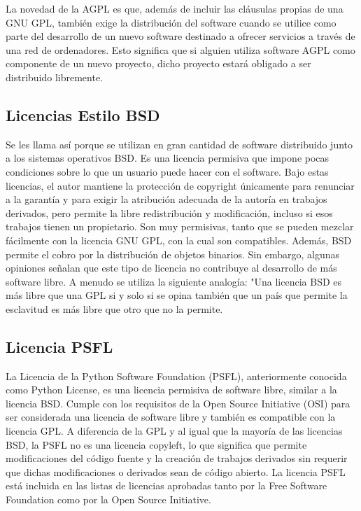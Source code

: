 La novedad de la AGPL es que, además de incluir las cláusulas propias de una GNU GPL, también exige la distribución del software cuando se utilice como parte del desarrollo de un nuevo software destinado a ofrecer servicios a través de una red de ordenadores. Esto significa que si alguien utiliza software AGPL como componente de un nuevo proyecto, dicho proyecto estará obligado a ser distribuido libremente.\par
				
			\subsection{Licencias Estilo BSD}\label{bsd}
			
				Se les llama así porque se utilizan en gran cantidad de software distribuido junto a los sistemas operativos BSD. Es una licencia permisiva que impone pocas condiciones sobre lo que un usuario puede hacer con el software. Bajo estas licencias, el autor mantiene la protección de copyright únicamente para renunciar a la garantía y para exigir la atribución adecuada de la autoría en trabajos derivados, pero permite la libre redistribución y modificación, incluso si esos trabajos tienen un propietario. Son muy permisivas, tanto que se pueden mezclar fácilmente con la licencia GNU GPL, con la cual son compatibles. Además, BSD permite el cobro por la distribución de objetos binarios. Sin embargo, algunas opiniones señalan que este tipo de licencia no contribuye al desarrollo de más software libre. A menudo se utiliza la siguiente analogía: "Una licencia BSD es más libre que una GPL si y solo si se opina también que un país que permite la esclavitud es más libre que otro que no la permite.\par
			
			\subsection{Licencia PSFL}\label{psfl}
			
				La Licencia de la Python Software Foundation (PSFL), anteriormente conocida como Python License, es una licencia permisiva de software libre, similar a la licencia BSD. Cumple con los requisitos de la Open Source Initiative (OSI) para ser considerada una licencia de software libre y también es compatible con la licencia GPL. A diferencia de la GPL y al igual que la mayoría de las licencias BSD, la PSFL no es una licencia copyleft, lo que significa que permite modificaciones del código fuente y la creación de trabajos derivados sin requerir que dichas modificaciones o derivados sean de código abierto. La licencia PSFL está incluida en las listas de licencias aprobadas tanto por la Free Software Foundation como por la Open Source Initiative.\par
				
